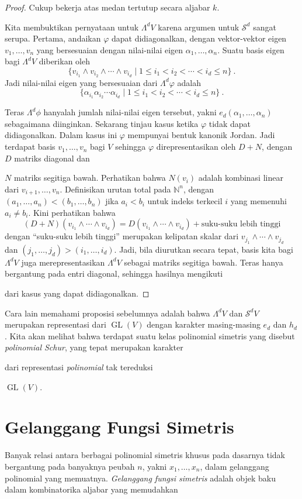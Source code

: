 \documentclass[12pt]{article}
\theoremstyle{plain}
\theoremstyle{definition}
\theoremstyle{remark}
\numberwithin{equation}{section}
\begin{document}
\begin{proof}
Cukup bekerja atas medan tertutup secara aljabar $k$.

Kita membuktikan pernyataan untuk $\Lambda^d V$ karena argumen untuk
$\mathcal{S}^d$ sangat serupa. 
Pertama, andaikan $\varphi$ dapat didiagonalkan, dengan vektor-vektor eigen
$v_1,\ldots, v_n$ yang bersesuaian dengan nilai-nilai eigen
$\alpha_1,\ldots,\alpha_n$.
Suatu basis eigen bagi $\Lambda^d V$ diberikan oleh
\[
\{ v_{i_1}\wedge v_{i_2}\wedge \cdots \wedge v_{i_d} \mid
1 \le i_1 < i_2 < \cdots < i_d \le n \} \ .
\]
Jadi nilai-nilai eigen yang bersesuaian dari $\Lambda^d \varphi$ adalah
\[
\{ \alpha_{i_1} \alpha_{i_2} \cdots \alpha_{i_d} \mid
1 \le i_1 < i_2 < \cdots < i_d \le n \} \ .
\]

Teras $\Lambda^d \phi$ hanyalah jumlah nilai-nilai eigen tersebut, yakni
$e_d(\alpha_1,\ldots,\alpha_n)$ sebagaimana diinginkan.
Sekarang tinjau kasus ketika $\varphi$ tidak dapat didiagonalkan.
Dalam kasus ini $\varphi$ mempunyai bentuk kanonik Jordan. Jadi
terdapat basis $v_1,\ldots, v_n$ bagi $V$ sehingga $\varphi$
direpresentasikan oleh $D+N$, dengan $D$ matriks diagonal dan

$N$ matriks segitiga bawah.
Perhatikan bahwa $N(v_i)$ adalah kombinasi linear dari $v_{i+1},\ldots, v_n$.
Definisikan urutan total pada $\mathbb{N}^n$, dengan
$(a_1,\ldots,a_n) < (b_1,\ldots,b_n)$ jika $a_i < b_i$ untuk indeks terkecil $i$
yang memenuhi $a_i \ne b_i$.
Kini perhatikan bahwa
\[
(D+N)(v_{i_1}\wedge \cdots \wedge v_{i_d})
= D(v_{i_1}\wedge \cdots \wedge v_{i_d})
+ \textrm{suku-suku lebih tinggi} 
\]
dengan ``suku-suku lebih tinggi'' merupakan kelipatan skalar dari
$v_{j_1}\wedge \cdots \wedge v_{j_d}$
dan $(j_1,\ldots,j_d) > (i_1,\ldots,i_d)$.
Jadi, bila diurutkan secara tepat, basis kita bagi $\Lambda^d V$
juga merepresentasikan $\Lambda^d V$ sebagai matriks segitiga bawah.
Teras hanya bergantung pada entri diagonal, sehingga hasilnya mengikuti

dari kasus yang dapat didiagonalkan.
\end{proof}
Cara lain memahami proposisi sebelumnya adalah bahwa
$\Lambda^d V$ dan $\mathcal{S}^d V$ merupakan representasi dari
$\operatorname{GL}(V)$ dengan karakter masing-masing $e_d$ dan
$h_d$.
Kita akan melihat bahwa terdapat suatu kelas polinomial simetris
yang disebut \emph{polinomial Schur}, yang tepat merupakan karakter


dari representasi \emph{polinomial} tak tereduksi

$\operatorname{GL}(V)$.
\section{Gelanggang Fungsi Simetris}
Banyak relasi antara berbagai polinomial simetris khusus pada dasarnya
tidak bergantung pada banyaknya peubah $n$, yakni $x_1,\ldots,x_n$,
dalam gelanggang polinomial yang memuatnya. \emph{Gelanggang fungsi simetris}
adalah objek baku dalam kombinatorika aljabar yang memudahkan
\end{document}
